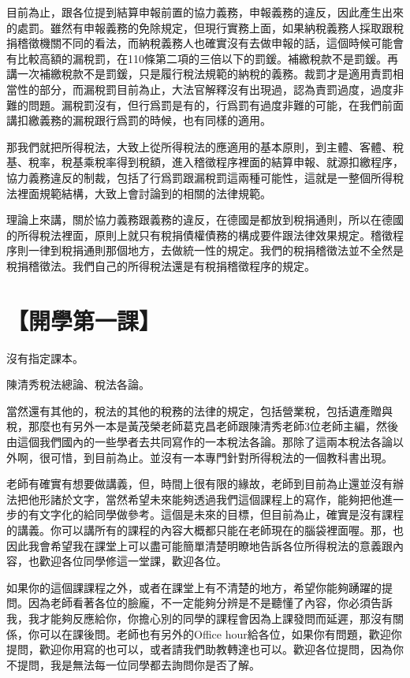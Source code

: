 \documentclass[oneside,sub3section]{ctexbook}
\begin{document}
目前為止，跟各位提到結算申報前置的協力義務，申報義務的違反，因此產生出來的處罰。雖然有申報義務的免除規定，但現行實務上面，如果納稅義務人採取跟稅捐稽徵機關不同的看法，而納稅義務人也確實沒有去做申報的話，這個時候可能會有比較高額的漏稅罰，在110條第二項的三倍以下的罰鍰。補繳稅款不是罰鍰。再講一次補繳稅款不是罰鍰，只是履行稅法規範的納稅的義務。裁罰才是適用責罰相當性的部分，而漏稅罰目前為止，大法官解釋沒有出現過，認為責罰過度，過度非難的問題。漏稅罰沒有，但行爲罰是有的，行爲罰有過度非難的可能，在我們前面講扣繳義務的漏稅跟行爲罰的時候，也有同樣的適用。

那我們就把所得稅法，大致上從所得稅法的應適用的基本原則，到主體、客體、稅基、稅率，稅基乘稅率得到稅額，進入稽徵程序裡面的結算申報、就源扣繳程序，協力義務違反的制裁，包括了行爲罰跟漏稅罰這兩種可能性，這就是一整個所得稅法裡面規範結構，大致上會討論到的相關的法律規範。

理論上來講，關於協力義務跟義務的違反，在德國是都放到稅捐通則，所以在德國的所得稅法裡面，原則上就只有稅捐債權債務的構成要件跟法律效果規定。稽徵程序則一律到稅捐通則那個地方，去做統一性的規定。我們的稅捐稽徵法並不全然是稅捐稽徵法。我們自己的所得稅法還是有稅捐稽徵程序的規定。

\hypertarget{appendix-ux9644ux9304}{%
\appendix {}}


\hypertarget{ux958bux5b78ux7b2cux4e00ux8ab2}{%
\chapter{【開學第一課】}\label{ux958bux5b78ux7b2cux4e00ux8ab2}}

沒有指定課本。

陳清秀稅法總論、稅法各論。

當然還有其他的，稅法的其他的稅務的法律的規定，包括營業稅，包括遺產贈與稅，那麼也有另外一本是黃茂榮老師葛克昌老師跟陳清秀老師3位老師主編，然後由這個我們國內的一些學者去共同寫作的一本稅法各論。那除了這兩本稅法各論以外啊，很可惜，到目前為止。並沒有一本專門針對所得稅法的一個教科書出現。

老師有確實有想要做講義，但，時間上很有限的緣故，老師到目前為止還並沒有辦法把他形諸於文字，當然希望未來能夠透過我們這個課程上的寫作，能夠把他進一步的有文字化的給同學做參考。這個是未來的目標，但目前為止，確實是沒有課程的講義。你可以講所有的課程的內容大概都只能在老師現在的腦袋裡面喔。那，也因此我會希望我在課堂上可以盡可能簡單清楚明瞭地告訴各位所得稅法的意義跟內容，也歡迎各位同學修這一堂課，歡迎各位。

如果你的這個課課程之外，或者在課堂上有不清楚的地方，希望你能夠踴躍的提問。因為老師看著各位的臉龐，不一定能夠分辨是不是聽懂了內容，你必須告訴我，我才能夠反應給你，你擔心別的同學的課程會因為上課發問而延遲，那沒有關係，你可以在課後問。老師也有另外的Office hour給各位，如果你有問題，歡迎你提問，歡迎你用寫的也可以，或者請我們助教轉達也可以。歡迎各位提問，因為你不提問，我是無法每一位同學都去詢問你是否了解。
\end{document}
